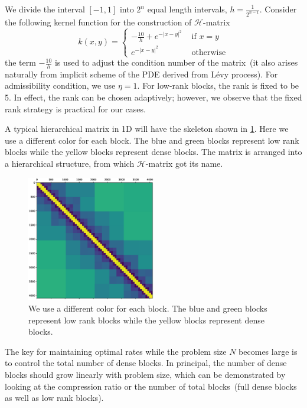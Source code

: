 \documentclass[3p,,preprint,12pt]{elsarticle}
\theoremstyle{definition}
\begin{document}
We divide the interval $[-1,1]$ into $2^n$ equal length intervals, $h=\frac{1}{2^{n-1}}$. Consider the following kernel function for the construction of $\mathcal{H}$-matrix
\begin{equation}
	k(x,y) = \begin{cases}
		-\frac{10}{h} + e^{-|x-y|^2} & \mbox{ if } x=y\\
		e^{-|x-y|^2} & \mbox{ otherwise}
	\end{cases}
\end{equation}
the term $-\frac{10}{h}$ is used to adjust the condition number of the matrix~(it also arises naturally from implicit scheme of the PDE derived from L\'evy process). For admissibility condition,  we use $\eta=1$. For low-rank blocks, the rank is fixed to be 5. In effect, the rank can be chosen adaptively; however, we observe that the fixed rank strategy is practical for our cases. 

A typical hierarchical matrix in 1D will have the skeleton shown in \cref{fig:1D}. Here we use a different color for each block. The blue and green blocks represent low rank blocks while the yellow blocks represent dense blocks. The matrix is arranged into a hierarchical structure, from which $\mathcal{H}$-matrix got its name. 

\begin{figure}[H] %
\centering
\includegraphics[width=0.5\textwidth,keepaspectratio]{figures/1D}
\caption{We use a different color for each block. The blue and green blocks represent low rank blocks while the yellow blocks represent dense blocks.}
\label{fig:1D}
\end{figure} 


The key for maintaining optimal rates while the problem size $N$ becomes large is to control the total number of dense blocks. In principal, the number of dense blocks should grow linearly with problem size, which can be demonstrated by looking at the compression ratio or the number of total blocks~(full dense blocks as well as low rank blocks). 
\end{document}
